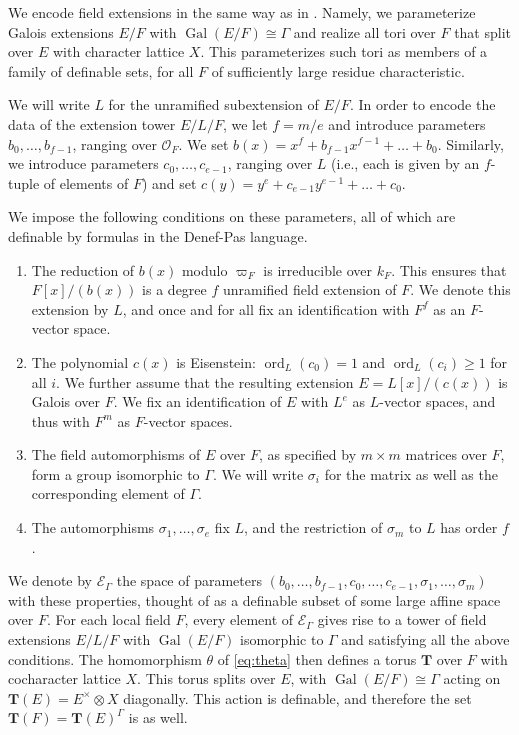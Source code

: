 \documentclass{amsart}
\newcommand{\ri}{\mathcal{O}}
\newcommand{\gal}{\operatorname{Gal}}
\newcommand{\bT}{\mathbf {T}}
\newcommand\cE{{\mathcal E}}
\DeclareMathOperator{\Gal}{Gal}
\DeclareMathOperator{\ord}{ord}
\theoremstyle{plain}
\theoremstyle{definition}
\begin{document}
We encode field extensions in the same way as in \cite{CGH-2}.
Namely, we parameterize Galois extensions $E/F$ with $\Gal(E/F) \cong \Gamma$
and realize all tori over $F$ that split over $E$ with character lattice $X$.
This parameterizes such tori as members of a family of definable sets,
for all $F$ of sufficiently large residue characteristic. 

We will write $L$ for the unramified subextension of $E/F$.  In order to encode the data of the extension tower $E/L/F$, we let $f=m/e$ and introduce parameters $b_0,\dots, b_{f-1}$, ranging over $\ri_F$.
We set $b(x)=x^f+b_{f-1}x^{f-1}+ \dots + b_0$. 
Similarly, we introduce parameters $c_0, \dots, c_{e-1}$, ranging over $L$
(i.e., each is given by an $f$-tuple of elements of $F$) and set $c(y) = y^e + c_{e-1}y^{e-1} + \dots + c_0$.

We impose the following conditions on these parameters, all of which are definable by formulas in the Denef-Pas language. 
\begin{enumerate}
\item The reduction of $b(x)$ modulo $\varpi_F$ is irreducible over $k_F$. 
This ensures that $F[x]/(b(x))$ is a degree $f$ unramified field extension of $F$. 
We denote this extension by $L$, and once and for all fix an identification with $F^f$ as 
an $F$-vector space. 
\item The polynomial $c(x)$ is Eisenstein: $\ord_L(c_0) = 1$ and $\ord_L(c_i) \ge 1$ for all $i$.
We further assume that the resulting extension $E = L[x]/(c(x))$ is Galois over $F$.
We fix an identification of $E$ with $L^e$ as $L$-vector spaces, and thus with $F^m$ as $F$-vector spaces. 
\item The field automorphisms of $E$ over $F$, as specified by $m \times m$ matrices over $F$, form a group isomorphic to $\Gamma$.
We will write $\sigma_i$ for the matrix as well as the corresponding element of $\Gamma$.
\item The automorphisms $\sigma_1, \dots, \sigma_e$ fix $L$, and the restriction of $\sigma_m$ to $L$ has order $f$.
\end{enumerate}
We denote by $\cE_\Gamma$ the space of parameters $(b_0, \dots, b_{f-1}, c_0, \dots, c_{e-1}, \sigma_1, \dots, \sigma_m)$ with these properties,
thought of as a definable subset of some large affine space over $F$.
For each local field $F$, every element of $\cE_\Gamma$ gives rise to a tower of field extensions $E/L/F$
with $\gal(E/F)$ isomorphic to $\Gamma$ and satisfying all the above conditions.
The homomorphism $\theta$ of \eqref{eq:theta} then defines a torus $\bT$ over $F$ with cocharacter lattice $X$.
This torus splits over $E$, with $\gal(E/F) \cong \Gamma$ acting on $\bT(E) = E^\times \otimes X$ diagonally.
This action is definable, and therefore the set $\bT(F) = \bT(E)^\Gamma$ is as well.
\end{document}
